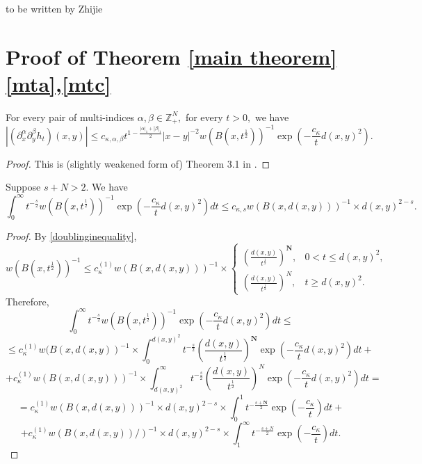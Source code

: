 \documentclass{amsart}
\begin{document}
{\color{red} \Huge to be written by Zhijie}

\section{Proof of Theorem \ref{main theorem} \eqref{mta},\eqref{mtc}}

\begin{lemma}\label{heat kernel estimate} For every pair of multi-indices $\alpha,\beta\in\mathbb{Z}^N_+,$ for every $t>0,$ we have
$$|(\partial_x^{\alpha}\partial_y^{\beta}h_t)(x,y)|\leq c_{\kappa,\alpha,\beta}t^{1-\frac{|\alpha|_1+|\beta|_1}{2}}|x-y|^{-2}w(B(x,t^{\frac12}))^{-1}\exp(-\frac{c_{\kappa}}{t}d(x,y)^2).$$
\end{lemma}
\begin{proof} This is (slightly weakened form of) Theorem 3.1 in \cite{MR4042416}.
\end{proof}

\begin{lemma}\label{zhijie kernel estimate} Suppose $s+N>2.$ We have
$$\int_0^{\infty}t^{-\frac{s}{2}}w(B(x,t^{\frac12}))^{-1}\exp(-\frac{c_{\kappa}}{t}d(x,y)^2)dt\leq c_{\kappa,s}w(B(x,d(x,y)))^{-1}\times d(x,y)^{2-s}.$$
\end{lemma}
\begin{proof} By \eqref{doublinginequality},
$$w(B(x,t^{\frac12}))^{-1}\leq c_{\kappa}^{(1)}w(B(x,d(x,y)))^{-1}\times
\begin{cases}
\left(\frac{d(x,y)}{t^{\frac12}}\right)^{\mathbf{N}},
&0<t\leq d(x,y)^2,\\
\left(\frac{d(x,y)}{t^{\frac12}}\right)^N,&t\geq d(x,y)^2.
\end{cases}$$
Therefore,
$$\int_0^{\infty}t^{-\frac{s}{2}}w(B(x,t^{\frac12}))^{-1}\exp(-\frac{c_{\kappa}}{t}d(x,y)^2)dt\leq$$
$$\leq c_{\kappa}^{(1)}w(B(x,d(x,y))^{-1}\times\int_0^{d(x,y)^2}t^{-\frac{s}{2}}\left(\frac{d(x,y)}{t^{\frac12}}\right)^{\mathbf{N}}\exp(-\frac{c_{\kappa}}{t}d(x,y)^2)dt+$$
$$+c_{\kappa}^{(1)}w(B(x,d(x,y)))^{-1}\times\int_{d(x,y)^2}^{\infty}t^{-\frac{s}{2}}\left(\frac{d(x,y)}{t^{\frac12}}\right)^N\exp(-\frac{c_{\kappa}}{t}d(x,y)^2)dt=$$
$$=c_{\kappa}^{(1)}w(B(x,d(x,y)))^{-1}\times d(x,y)^{2-s}\times\int_0^1t^{-\frac{s+\mathbf{N}}{2}}\exp(-\frac{c_{\kappa}}{t})dt+$$
$$+c_{\kappa}^{(1)}w(B(x,d(x,y))/)^{-1}\times d(x,y)^{2-s}\times\int_1^{\infty}t^{-\frac{s+N}{2}}\exp(-\frac{c_{\kappa}}{t})dt.$$
\end{proof}
\end{document}
